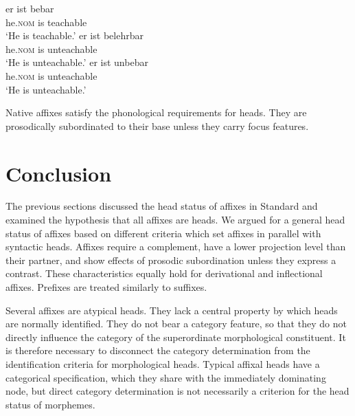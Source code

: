 \documentclass[output=paper
  ,nobabel
  ,draftmode
  ,colorlinks, citecolor=brown
]{langscibook}
\begin{document}
\eal
\ex
\gll er ist bebar \\
	he.\textsc{nom} is teachable\\
\glt	`He is teachable.'
\ex 
\gll er              ist belehrbar\\ 
     he.\textsc{nom} is  unteachable\\
\glt `He is unteachable.'
\ex
\gll er              ist unbebar \\
     he.\textsc{nom} is  unteachable\\
\glt `He is unteachable.'
\zl

\noindent 
Native affixes satisfy the phonological requirements for heads. They are prosodically subordinated to their base unless they carry focus features.

\section{Conclusion}\label{conclu-kor}

The previous sections discussed the head status of affixes in Standard  and examined the hypothesis that all affixes are heads. We argued for a general head status of affixes based on different criteria which set affixes in parallel with syntactic heads. Affixes require a complement, have a lower projection level than their partner, and show effects of prosodic subordination unless they express a contrast. These characteristics equally hold for derivational and inflectional affixes. Prefixes are treated similarly to suffixes.

Several affixes are atypical heads. They lack a central property by which heads are normally identified. They do not bear a category feature, so that they do not directly influence the category of the superordinate morphological constituent. It is therefore necessary to disconnect the category determination from the identification criteria for morphological heads. Typical affixal heads have a categorical specification, which they share with the immediately dominating node, but direct category determination is not necessarily a criterion for the head status of morphemes.
\end{document}
